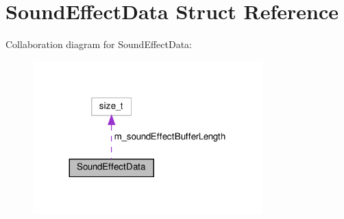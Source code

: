 \hypertarget{structSoundEffectData}{}\section{Sound\+Effect\+Data Struct Reference}
\label{structSoundEffectData}


Collaboration diagram for Sound\+Effect\+Data\+:
\nopagebreak
\begin{figure}[H]
\begin{center}
\leavevmode
\includegraphics[width=251pt]{structSoundEffectData__coll__graph}
\end{center}
\end{figure}
